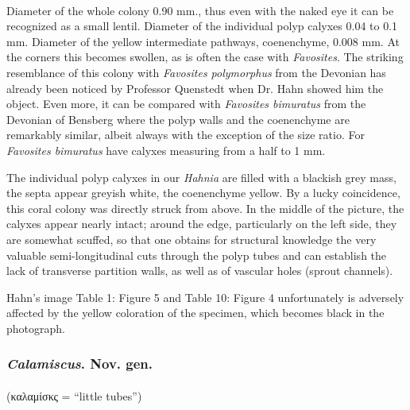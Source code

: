 \documentclass[a4paper, 12pt, oneside]{article}
\begin{document}
\paragraph*{}
Diameter of the whole colony 0.90 mm., thus even with the naked eye it can be recognized as a small lentil. Diameter of the individual polyp calyxes 0.04 to 0.1 mm. Diameter of the yellow intermediate pathways, coenenchyme, 0.008 mm. At the corners this becomes swollen, as is often the case with \emph{Favosites}. The striking resemblance of this colony with \emph{Favosites polymorphus} from the Devonian has already been noticed by Professor Quenstedt when Dr. Hahn showed him the object. Even more, it can be compared with \emph{Favosites bimuratus} from the Devonian of Bensberg where the polyp walls and the coenenchyme are remarkably similar, albeit always with the exception of the size ratio. For \emph{Favosites bimuratus} have calyxes measuring from a half to 1 mm.

The individual polyp calyxes in our \emph{Hahnia} are filled with a blackish grey mass, the septa appear greyish white, the coenenchyme yellow. By a lucky coincidence, this coral colony was directly struck from above. In the middle of the picture, the calyxes appear nearly intact; around the edge, particularly on the left side, they are somewhat scuffed, so that one obtains for structural knowledge the very valuable semi-longitudinal cuts through the polyp tubes and can establish the lack of transverse partition walls, as well as of vascular holes (sprout channels).

Hahn's image Table 1: Figure 5 and Table 10: Figure 4 unfortunately is adversely affected by the yellow coloration of the specimen, which becomes black in the photograph.
\subsubsection{\emph{Calamiscus}. Nov. gen.}
\paragraph*{}
(καλαμίσκς = ``little tubes'')%
\end{document}
